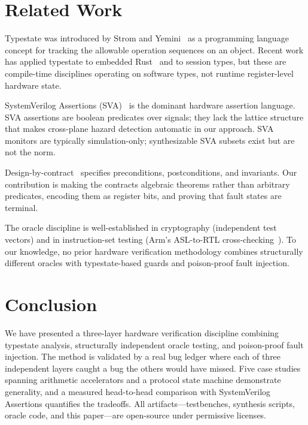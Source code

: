 \documentclass[conference]{IEEEtran}
\begin{document}
\section{Related Work}

Typestate was introduced by Strom and Yemini~\cite{strom86} as a programming
language concept for tracking the allowable operation sequences on an object.
Recent work has applied typestate to embedded Rust~\cite{coconut24} and to
session types, but these are compile-time disciplines operating on software
types, not runtime register-level hardware state.

SystemVerilog Assertions (SVA)~\cite{sva1800} is the dominant hardware
assertion language.  SVA assertions are boolean predicates over signals; they
lack the lattice structure that makes cross-plane hazard detection automatic in
our approach.  SVA monitors are typically simulation-only; synthesizable SVA
subsets exist but are not the norm.

Design-by-contract~\cite{meyer92} specifies preconditions, postconditions, and
invariants.  Our contribution is making the contracts algebraic theorems rather
than arbitrary predicates, encoding them as register bits, and proving that
fault states are terminal.

The oracle discipline is well-established in cryptography (independent test
vectors) and in instruction-set testing (Arm's ASL-to-RTL
cross-checking~\cite{reid16}).  To our knowledge, no prior hardware
verification methodology combines structurally different oracles with
typestate-based guards and poison-proof fault injection.

\section{Conclusion}

We have presented a three-layer hardware verification discipline combining
typestate analysis, structurally independent oracle testing, and poison-proof
fault injection.  The method is validated by a real bug ledger where each of
three independent layers caught a bug the others would have missed.  Five case
studies spanning arithmetic accelerators and a protocol state machine
demonstrate generality, and a measured head-to-head comparison with
SystemVerilog Assertions quantifies the tradeoffs.  All artifacts---testbenches,
synthesis scripts, oracle code, and this paper---are open-source under
permissive licenses.
\end{document}
